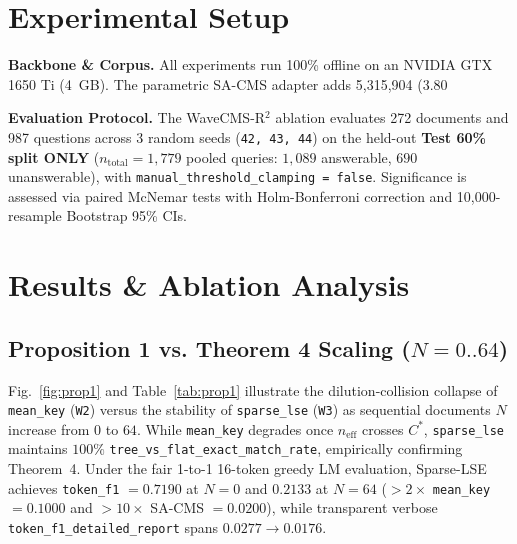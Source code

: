\documentclass[conference]{IEEEtran}
\begin{document}
\section{Experimental Setup}
\textbf{Backbone & Corpus.} All experiments run 100\% offline on an NVIDIA GTX 1650 Ti (4~GB). The parametric SA-CMS adapter adds 5,315,904 (3.80%

\textbf{Evaluation Protocol.} The WaveCMS-R$^2$ ablation evaluates 272 documents and 987 questions across 3 random seeds (\texttt{42, 43, 44}) on the held-out \textbf{Test 60\% split ONLY} ($n_{\text{total}} = 1{,}779$ pooled queries: $1{,}089$ answerable, $690$ unanswerable), with \texttt{manual\_threshold\_clamping = false}. Significance is assessed via paired McNemar tests with Holm-Bonferroni correction and 10,000-resample Bootstrap 95\% CIs.

\section{Results \& Ablation Analysis}

\subsection{Proposition 1 vs. Theorem 4 Scaling ($N=0..64$)}
Fig.~\ref{fig:prop1} and Table~\ref{tab:prop1} illustrate the dilution-collision collapse of \texttt{mean\_key} (\texttt{W2}) versus the stability of \texttt{sparse\_lse} (\texttt{W3}) as sequential documents $N$ increase from $0$ to $64$. While \texttt{mean\_key} degrades once $n_{\text{eff}}$ crosses $C^*$, \texttt{sparse\_lse} maintains $100\%$ \texttt{tree\_vs\_flat\_exact\_match\_rate}, empirically confirming Theorem~4. Under the fair 1-to-1 16-token greedy LM evaluation, Sparse-LSE achieves \texttt{token\_f1} $= 0.7190$ at $N=0$ and $0.2133$ at $N=64$ ($>2\times$ \texttt{mean\_key} $= 0.1000$ and $>10\times$ SA-CMS $= 0.0200$), while transparent verbose \texttt{token\_f1\_detailed\_report} spans $0.0277 \to 0.0176$.
\end{document}
